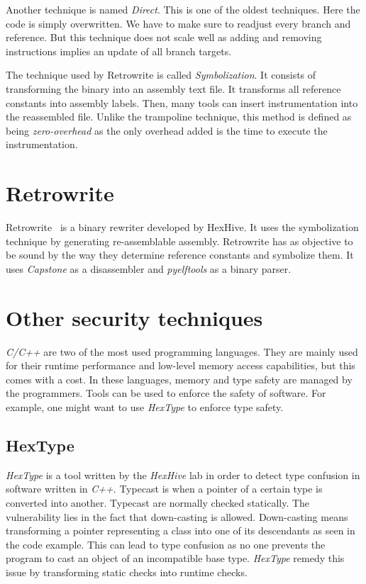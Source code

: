 \documentclass[a4paper,11pt,oneside]{report}
\newcommand{\sysname}{Retrowrite\xspace}
\begin{document}
Another technique is named \textit{Direct}. This is one of the oldest
techniques. Here the code is simply overwritten. We have to make sure to readjust
every branch and reference.  But this technique does not scale well as adding
and removing instructions implies an update of all branch targets.


The technique used by \sysname is called \textit{Symbolization}. It
consists of transforming the binary into an assembly text file. It transforms
all reference constants into assembly labels. Then, many tools can insert
instrumentation into the reassembled file. Unlike the trampoline technique,
this method is defined as being \textit{zero-overhead} as the only overhead
added is the time to execute the instrumentation.


\section{Retrowrite}
Retrowrite~\cite{dinesh20oakland} is a binary rewriter developed by HexHive.
It uses the symbolization technique by generating re-assemblable assembly.
Retrowrite has as objective to be sound by the way they determine reference
constants and symbolize them. It uses
\textit{Capstone} as a disassembler and \textit{pyelftools} as a binary parser.

\section{Other security techniques}
\textit{C/C++} are two of the most used programming languages. They are
mainly used for their runtime performance and low-level memory access
capabilities, but this comes with a cost. In these languages, memory and type
safety are managed by the programmers. Tools can be used to enforce the safety
of software. For example, one might want to use \textit{HexType} to enforce
type safety.

\subsection{HexType}
\textit{HexType} is a tool written by the \textit{HexHive} lab in order to
detect type confusion in software written in \textit{C++}. Typecast is when a
pointer of a certain type is converted into another. Typecast are
normally checked statically. The vulnerability lies in the fact that
down-casting is allowed. Down-casting means transforming a pointer representing
a class into one of its descendants as seen in the code example. This can lead
to type confusion as no one prevents the program to cast an object of
an incompatible base type. \textit{HexType} remedy this issue by transforming
static checks into runtime checks.
\end{document}
